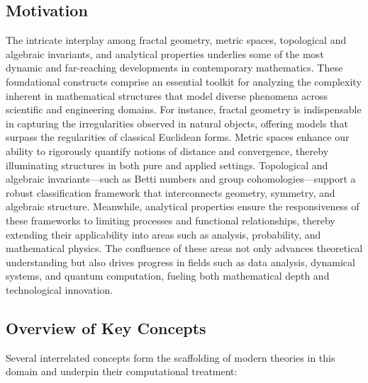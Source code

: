 \documentclass[sigconf]{acmart}
\begin{document}
\maketitle

\subsection{Motivation}

The intricate interplay among fractal geometry, metric spaces, topological and algebraic invariants, and analytical properties underlies some of the most dynamic and far-reaching developments in contemporary mathematics. These foundational constructs comprise an essential toolkit for analyzing the complexity inherent in mathematical structures that model diverse phenomena across scientific and engineering domains. For instance, fractal geometry is indispensable in capturing the irregularities observed in natural objects, offering models that surpass the regularities of classical Euclidean forms. Metric spaces enhance our ability to rigorously quantify notions of distance and convergence, thereby illuminating structures in both pure and applied settings. Topological and algebraic invariants—such as Betti numbers and group cohomologies—support a robust classification framework that interconnects geometry, symmetry, and algebraic structure. Meanwhile, analytical properties ensure the responsiveness of these frameworks to limiting processes and functional relationships, thereby extending their applicability into areas such as analysis, probability, and mathematical physics. The confluence of these areas not only advances theoretical understanding but also drives progress in fields such as data analysis, dynamical systems, and quantum computation, fueling both mathematical depth and technological innovation.

\subsection{Overview of Key Concepts}

Several interrelated concepts form the scaffolding of modern theories in this domain and underpin their computational treatment:
\end{document}
